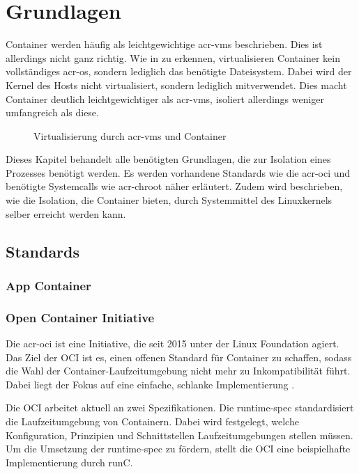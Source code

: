 \chapter{Grundlagen}
\label{chap:grundlagen}
Container werden häufig als leichtgewichtige \glspl{acr-vm} beschrieben. Dies ist allerdings nicht ganz richtig. Wie in  zu erkennen, virtualisieren Container kein vollständiges \gls{acr-os}, sondern lediglich das benötigte Dateisystem. Dabei wird der Kernel des Hosts nicht virtualisiert, sondern lediglich mitverwendet. Dies macht Container deutlich leichtgewichtiger als \glspl{acr-vm}, isoliert allerdings weniger umfangreich als diese.
\begin{figure}[h]
		\hfill
		\caption{Virtualisierung durch \glspl{acr-vm} und Container}
		\label{fig:containerVvm}
\end{figure}

Dieses Kapitel behandelt alle benötigten Grundlagen, die zur Isolation eines Prozesses benötigt werden. Es werden vorhandene Standards wie die \gls{acr-oci} und benötigte Systemcalls wie \gls{acr-chroot} näher erläutert. Zudem wird beschrieben, wie die Isolation, die Container bieten, durch Systemmittel des Linuxkernels selber erreicht werden kann.
\section{Standards}
\label{sec:standards}

\subsection{App Container}
\label{sec:appc}
\subsection{Open Container Initiative}
\label{sec:oci}
Die \gls{acr-oci} ist eine Initiative, die seit 2015 unter der Linux Foundation agiert. Das Ziel der OCI ist es, einen offenen Standard für Container zu schaffen, sodass die Wahl der Container-Laufzeitumgebung nicht mehr zu Inkompatibilität führt. Dabei liegt der Fokus auf eine einfache, schlanke Implementierung \citep{OpenContainerInitiative}.

Die OCI arbeitet aktuell an zwei Spezifikationen. Die runtime-spec standardisiert die Laufzeitumgebung  von Containern. Dabei wird festgelegt, welche Konfiguration, Prinzipien und Schnittstellen Laufzeitumgebungen stellen müssen. Um die Umsetzung der runtime-spec zu fördern, stellt die OCI eine beispielhafte Implementierung durch runC.


